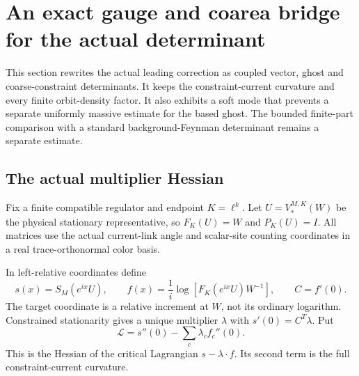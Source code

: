 \section{An exact gauge and coarea bridge for the actual determinant}
\label{dgb-section}

This section rewrites the actual leading correction as coupled
vector, ghost and coarse-constraint determinants. It keeps the
constraint-current curvature and every finite orbit-density factor.
It also exhibits a soft mode that prevents a separate uniformly
massive estimate for the based ghost. The bounded finite-part
comparison with a standard background-Feynman determinant remains
a separate estimate.

\subsection{The actual multiplier Hessian}
\label{dgb-setup-section}

Fix a finite compatible regulator and endpoint $K=\ell^k$.
Let $U=V_*^{M,K}(W)$ be the physical stationary representative,
so $F_K(U)=W$ and $P_K(U)=I$. All matrices use the actual
current-link angle and scalar-site counting coordinates in a real
trace-orthonormal color basis.

In left-relative coordinates define
\begin{equation}
 s(x)=S_M(e^{ix}U),\qquad
 f(x)=\frac1i\log\!\left[F_K(e^{ix}U)W^{-1}\right],
 \qquad C=f'(0).
 \label{dgb-relative-coordinates}
\end{equation}
The target coordinate is a relative increment at $W$, not its
ordinary logarithm. Constrained stationarity gives a unique
multiplier $\lambda$ with $s'(0)=C^T\lambda$. Put
\begin{equation}
 \mathcal L=s''(0)-\sum_c\lambda_c f_c''(0).
 \label{dgb-Lagrangian}
\end{equation}
This is the Hessian of the critical Lagrangian
$s-\lambda\cdot f$. Its second term is the full
constraint-current curvature.

